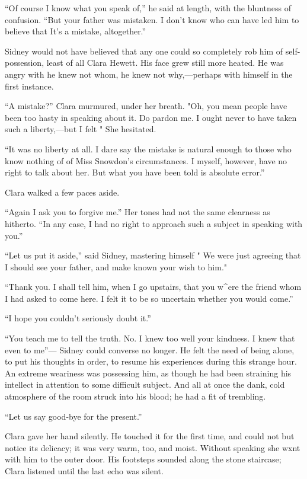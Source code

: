 ``Of course I know what you speak of,'' he said at length, with the
bluntness of confusion. ``But your father was mistaken. I don't know who
can have led him to believe that It's a mistake, altogether.''

Sidney would not have believed that any one could so completely rob him
of self-possession, least of all Clara Hewett. His face grew still more
heated. He was angry with he knew not whom, he knew not why,---perhaps
with himself in the first instance.

``A mistake?'' Clara murmured, under her breath. "Oh, you mean people
have been too hasty in speaking about it. Do pardon me.
{\protect\hypertarget{90}{}{}} I ought never to have taken such a
liberty,---but I felt " She hesitated.

``It was no liberty at all. I dare say the mistake is natural enough to
those who know nothing of of Miss Snowdon's circumstances. I myself,
however, have no right to talk about her. But what you have been told is
absolute error.''

Clara walked a few paces aside.

``Again I ask you to forgive me.'' Her tones had not the same clearness
as hitherto. ``In any case, I had no right to approach such a subject in
speaking with you.''

``Let us put it aside,'' said Sidney, mastering himself " We were just
agreeing that I should see your father, and make known your wish to
him."

``Thank you. I shall tell him, when I go upstairs, that you w\^{}ere the
friend whom I had asked to come here. I felt it to be so uncertain
whether you would come.''

``I hope you couldn't seriously doubt it.''

``You teach me to tell the truth. No. I knew too well your kindness. I
knew that even to me''--- {\protect\hypertarget{91}{}{}} Sidney could
converse no longer. He felt the need of being alone, to put his thoughts
in order, to resume his experiences during this strange hour. An extreme
weariness was possessing him, as though he had been straining his
intellect in attention to some difficult subject. And all at once the
dank, cold atmosphere of the room struck into his blood; he had a fit of
trembling.

``Let us say good-bye for the present.''

Clara gave her hand silently. He touched it for the first time, and
could not but notice its delicacy; it was very warm, too, and moist.
Without speaking she wxnt with him to the outer door. His footsteps
sounded along the stone staircase; Clara listened until the last echo
was silent.

